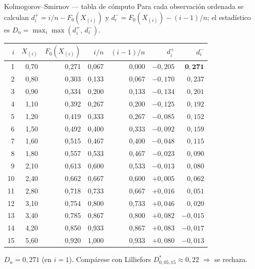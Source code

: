 \documentclass[aspectratio=1610, 10pt]{beamer}
\begin{document}
\begin{frame}{Kolmogorov--Smirnov — tabla de cómputo}
  Para cada observación ordenada se calculan $d^+_i=i/n-F_0(X_{(i)})$ y $d^-_i=F_0(X_{(i)})-(i-1)/n$;
  el estadístico es $D_n=\max_i\max(d^+_i,\,d^-_i)$.

  \begin{center}\scriptsize
    \renewcommand{\arraystretch}{1.1}
    \begin{tabular}{rrrrrrr}
      \toprule
      $i$ & $X_{(i)}$ & $F_0(X_{(i)})$ & $i/n$ & $(i-1)/n$ & $d^+_i$ & $d^-_i$ \\
      \midrule
      1 & 0{,}70 & 0{,}271 & 0{,}067 & 0{,}000 & $-0{,}205$ & $\mathbf{0{,}271}$ \\
      2 & 0{,}80 & 0{,}303 & 0{,}133 & 0{,}067 & $-0{,}170$ & $0{,}237$ \\
      3 & 0{,}90 & 0{,}334 & 0{,}200 & 0{,}133 & $-0{,}134$ & $0{,}201$ \\
      4 & 1{,}10 & 0{,}392 & 0{,}267 & 0{,}200 & $-0{,}125$ & $0{,}192$ \\
      5 & 1{,}20 & 0{,}419 & 0{,}333 & 0{,}267 & $-0{,}085$ & $0{,}152$ \\
      6 & 1{,}50 & 0{,}492 & 0{,}400 & 0{,}333 & $-0{,}092$ & $0{,}159$ \\
      7 & 1{,}60 & 0{,}515 & 0{,}467 & 0{,}400 & $-0{,}048$ & $0{,}115$ \\
      8 & 1{,}80 & 0{,}557 & 0{,}533 & 0{,}467 & $-0{,}023$ & $0{,}090$ \\
      9 & 2{,}10 & 0{,}613 & 0{,}600 & 0{,}533 & $-0{,}013$ & $0{,}080$ \\
      10 & 2{,}40 & 0{,}662 & 0{,}667 & 0{,}600 & $+0{,}005$ & $0{,}062$ \\
      11 & 2{,}80 & 0{,}718 & 0{,}733 & 0{,}667 & $+0{,}016$ & $0{,}051$ \\
      12 & 3{,}10 & 0{,}754 & 0{,}800 & 0{,}733 & $+0{,}046$ & $0{,}020$ \\
      13 & 3{,}40 & 0{,}785 & 0{,}867 & 0{,}800 & $+0{,}082$ & $-0{,}015$ \\
      14 & 4{,}20 & 0{,}850 & 0{,}933 & 0{,}867 & $+0{,}083$ & $-0{,}017$ \\
      15 & 5{,}60 & 0{,}920 & 1{,}000 & 0{,}933 & $+0{,}080$ & $-0{,}013$ \\
      \bottomrule
    \end{tabular}
  \end{center}

  \vspace{2pt}
  $D_n = 0{,}271$ (en $i=1$). Compárese con Lilliefors $D^*_{0{,}05,15}\approx 0{,}22$ $\Rightarrow$ se rechaza.
\end{frame}
\end{document}
